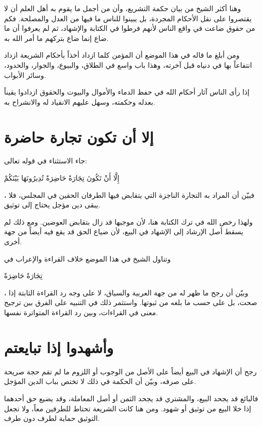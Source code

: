 وهنا أكثر الشيخ من بيان حكمة التشريع، وأن من أجمل ما يقوم به أهل العلم أن لا يقتصروا على نقل الأحكام المجردة، بل يبينوا للناس ما فيها من العدل والمصلحة. فكم من حقوق ضاعت في واقع الناس لأنهم فرطوا في الكتابة والإشهاد، ثم لم يعرفوا أن ما ضاع إنما ضاع بتركهم ما أمر الله به.

ومن أبلغ ما قاله في هذا الموضع أن المؤمن كلما ازداد أخذاً بأحكام الشريعة ازداد انتفاعاً بها في دنياه قبل آخرته، وهذا باب واسع في الطلاق، والبيوع، والجوار، والحدود، وسائر الأبواب.

\begin{fawaid}
إذا رأى الناس آثار أحكام الله في حفظ الدماء والأموال والبيوت والحقوق ازدادوا يقيناً بعدله وحكمته، وسهل عليهم الانقياد له والانشراح به.
\end{fawaid}

\section{إلا أن تكون تجارة حاضرة}
جاء الاستثناء في قوله تعالى: \begin{ayah}إِلَّا أَنْ تَكُونَ تِجَارَةً حَاضِرَةً تُدِيرُونَهَا بَيْنَكُمْ\end{ayah}، فبيّن  أن المراد به التجارة الناجزة التي يتقابض فيها الطرفان الحقين في المجلس، فلا يبقى دين مؤجل يحتاج إلى توثيق.

ولهذا رخص الله في ترك الكتابة هنا، لأن موجبها قد زال بتقابض العوضين. ومع ذلك لم يسقط أصل الإرشاد إلى الإشهاد في البيع، لأن ضياع الحق قد يقع فيه أيضاً من جهة أخرى.

وتناول الشيخ في هذا الموضع خلاف القراءة والإعراب في \begin{ayah}تِجَارَةً حَاضِرَةً\end{ayah}، وبيّن أن  رجح ما ظهر له من جهة العربية والسياق، لا على وجه رد القراءة الثابتة إذا صحت، بل على حسب ما بلغه من ثبوتها. واستثمر ذلك في التنبيه على الفرق بين ترجيح معنى في القراءات، وبين رد القراءة المتواترة نفسها.

\section{وأشهدوا إذا تبايعتم}
رجح  أن الإشهاد في البيع أيضاً على الأصل من الوجوب أو اللزوم ما لم تقم حجة صريحة على صرفه، وبيّن أن الحكمة في ذلك لا تختص بباب الدين المؤجل.

فالبائع قد يجحد البيع، والمشتري قد يجحد الثمن أو أصل المعاملة، وقد يضيع حق أحدهما إذا خلا البيع من توثيق أو شهود. ومن هنا كانت الشريعة تحتاط للطرفين معاً، ولا تجعل التوثيق حماية لطرف دون طرف.

